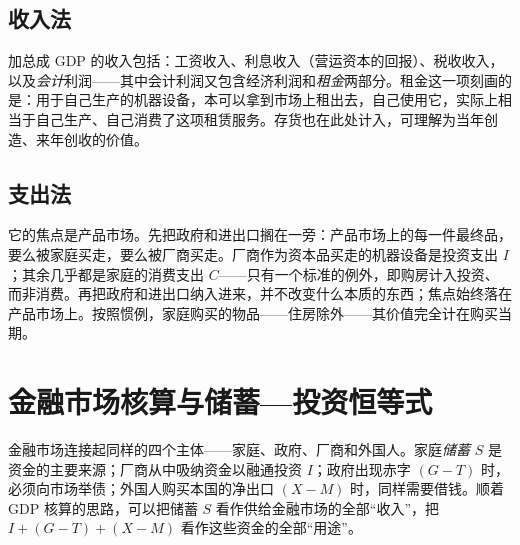 \subsection{收入法}


加总成 GDP 的收入包括：工资收入、利息收入（营运资本的回报）、税收收入，以及\emph{会计}利润——其中会计利润又包含经济利润和\emph{租金}两部分。租金这一项刻画的是：用于自己生产的机器设备，本可以拿到市场上租出去，自己使用它，实际上相当于自己生产、自己消费了这项租赁服务。存货也在此处计入，可理解为当年创造、来年创收的价值。

\subsection{支出法}


它的焦点是产品市场。先把政府和进出口搁在一旁：产品市场上的每一件最终品，要么被家庭买走，要么被厂商买走。厂商作为资本品买走的机器设备是投资支出 $I$；其余几乎都是家庭的消费支出 $C$——只有一个标准的例外，即购房计入投资、而非消费。再把政府和进出口纳入进来，并不改变什么本质的东西；焦点始终落在产品市场上。按照惯例，家庭购买的物品——住房除外——其价值完全计在购买当期。


\section{金融市场核算与储蓄—投资恒等式}

金融市场连接起同样的四个主体——家庭、政府、厂商和外国人。家庭\emph{储蓄} $S$ 是资金的主要来源；厂商从中吸纳资金以融通投资 $I$；政府出现赤字 $(G-T)$ 时，必须向市场举债；外国人购买本国的净出口 $(X-M)$ 时，同样需要借钱。顺着 GDP 核算的思路，可以把储蓄 $S$ 看作供给金融市场的全部“收入”，把 $I + (G-T) + (X-M)$ 看作这些资金的全部“用途”。

